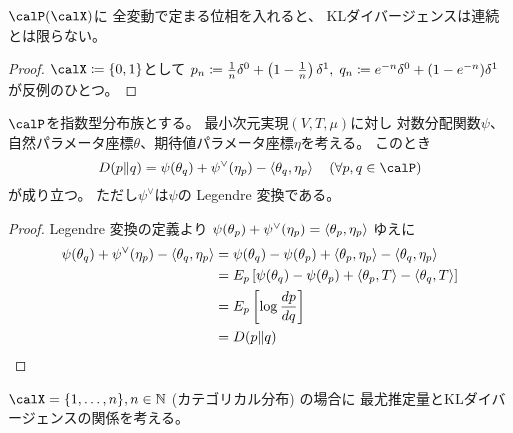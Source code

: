 \documentclass[report]{jlreq}
\begin{document}
\begin{proposition}
    $\calP(\calX)$に
    全変動で定まる位相を入れると、
    KLダイバージェンスは連続とは限らない。
\end{proposition}

\begin{proof}
    $\calX \coloneqq \{ 0, 1 \}$として
    $p_n \coloneqq \frac{1}{n} \delta^0 + \left({1 - \frac{1}{n}}\right) \delta^1, \;
        q_n \coloneqq e^{-n} \delta^0 + (1 - e^{-n}) \delta^1$
    が反例のひとつ。
\end{proof}

\begin{proposition}[指数型分布族とKLダイバージェンス]
    $\calP$を指数型分布族とする。
    最小次元実現$(V, T, \mu)$に対し
    対数分配関数$\psi$、自然パラメータ座標$\theta$、期待値パラメータ座標$\eta$を考える。
    このとき
    \begin{equation}
        D(p \| q)
            =
                \psi(\theta_q) + \psi^\vee(\eta_p)
                    - \myangle{\theta_q}{\eta_p}
                \quad
                (\forall p, q \in \calP)
    \end{equation}
    が成り立つ。
    ただし$\psi^\vee$は$\psi$の Legendre 変換である。
\end{proposition}

\begin{proof}
    Legendre 変換の定義より
    $\psi(\theta_p) + \psi^\vee(\eta_p)
        = \left\langle{\theta_p},{\eta_p}\right\rangle$
    ゆえに
    \begin{alignat}{1}
        \psi(\theta_q) + \psi^\vee(\eta_p)
            - \left\langle{\theta_q},{\eta_p}\right\rangle
            &=
                \psi(\theta_q) - \psi(\theta_p)
                    + \left\langle{\theta_p},{\eta_p}\right\rangle
                    - \left\langle{\theta_q},{\eta_p}\right\rangle
                \\
            &=
                E_p \left[{
                    \psi(\theta_q) - \psi(\theta_p)
                        + \left\langle{\theta_p},{T}\right\rangle
                        - \left\langle{\theta_q},{T}\right\rangle
                }\right]
                \\
            &=
                E_p \left[{
                    \log \frac{dp}{dq}
                }\right]
                \\
            &=
                D(p \| q)
    \end{alignat}
\end{proof}

$\calX = \{ 1, \ldots, n \}, n \in \N$ (カテゴリカル分布) の場合に
最尤推定量とKLダイバージェンスの関係を考える。
\end{document}
